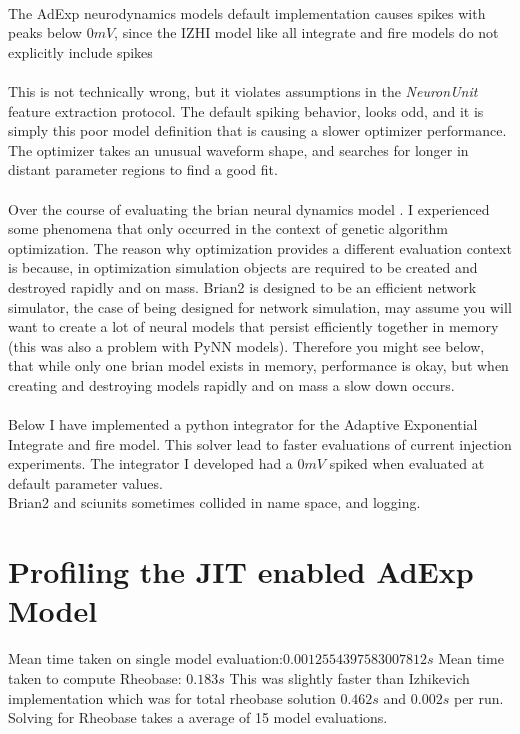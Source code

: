 \\
The AdExp neurodynamics models default implementation causes spikes with peaks below $0mV$, since the IZHI model like all integrate and fire models do not explicitly include spikes\\
\\
This is not technically wrong, but it violates
assumptions in the \emph{NeuronUnit} feature extraction protocol. The default spiking behavior, looks odd, and it is simply this poor model definition that is causing a slower optimizer performance. The optimizer takes an unusual waveform shape, and searches for longer in distant
parameter regions to find a good fit.\\
\\
Over the course of evaluating the brian neural dynamics model \cite{gerstner2014neuronal}. I experienced some phenomena that only occurred in the context of genetic algorithm optimization. The reason why optimization provides a different evaluation context is because, in optimization simulation objects are required to be created and destroyed rapidly and on mass. Brian2 is designed to be an efficient network simulator, the case of being designed for network simulation, may assume you will want to create a lot of neural models that persist efficiently together in memory (this was also a problem with PyNN models). Therefore you might see below, that while only one brian model exists in memory, performance is okay, but when creating and destroying models rapidly and on mass a slow down occurs.\\
\\
Below I have implemented a python integrator for the Adaptive Exponential Integrate and fire model. This solver lead to faster evaluations of current injection experiments. The integrator I developed had a $0mV$ spiked when evaluated at default parameter values.\\


Brian2 and sciunits sometimes collided in name space, and logging.

\section{Profiling the JIT enabled AdExp Model}
Mean time taken on single model evaluation:$ 0.0012554397583007812s $
Mean time taken to compute Rheobase:
$0.183s $
This was slightly faster than Izhikevich implementation which was for total rheobase solution $ 0.462s $ and $  0.002 s$ per run. Solving for Rheobase takes a average of 15 model evaluations.

